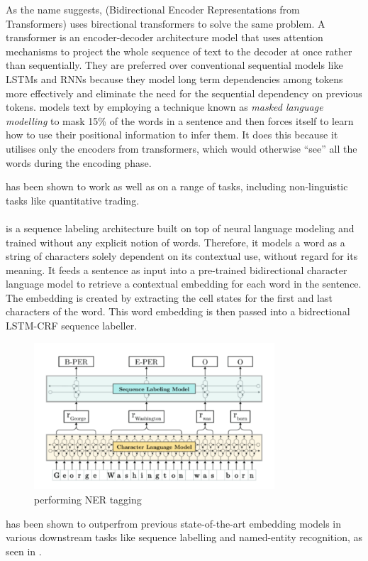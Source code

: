 As the name suggests, \bert (Bidirectional Encoder Representations from Transformers) uses birectional transformers to solve the same problem. A transformer is an encoder-decoder architecture model that uses attention mechanisms to project the whole sequence of text to the decoder at once rather than sequentially. They are preferred over conventional sequential models like LSTMs and RNNs because they model long term dependencies among tokens more effectively and eliminate the need for the sequential dependency on previous tokens. \bert models text by employing a technique known as \textit{masked language modelling} to mask 15\% of the words in a sentence and then forces itself to learn how to use their positional information to infer them. It does this because it utilises only the encoders from transformers, which would otherwise ``see'' all the words during the encoding phase.

\bert has been shown to work as well as \elmo on a range of tasks, including non-linguistic tasks like quantitative trading.

\paragraph{\flair}
\flair \citep{Akbik2018} is a sequence labeling architecture built on top of neural language modeling and trained without any explicit notion of words. Therefore, it models a word as a string of characters solely dependent on its contextual use, without regard for its meaning. It feeds a sentence as input into a pre-trained bidirectional character language model to retrieve a contextual embedding for each word in the sentence. The embedding is created by extracting the cell states for the first and last characters of the word. This word embedding is then passed into a bidrectional LSTM-CRF sequence labeller.

\begin{figure}[h!]
\begin{center}
\includegraphics[width=0.8\textwidth]{Figures/Flair.PNG}
\caption{\flair performing NER tagging\footnotemark}
\label{fig:flair}
\end{center}
\end{figure}
\flair has been shown to outperfrom previous state-of-the-art embedding models in various downstream tasks like sequence labelling and named-entity recognition, as seen in  \citep{Akbik2018}.

